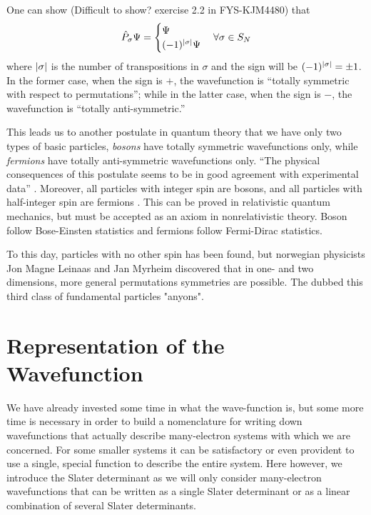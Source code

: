         One can show (Difficult to show? exercise 2.2 in FYS-KJM4480) that 
        \begin{equation}
            \hat{P}_\sigma\Psi = 
            \begin{cases}
                \Psi &\\
                (-1)^{\abs{\sigma}}\Psi& 
            \end{cases} \forall \sigma \in S_N
        \end{equation}
        where $\abs{\sigma}$ is the number of transpositions in $\sigma$ and the sign 
        will be $(-1)^{\abs{\sigma}} = \pm 1$. In the former case, when the sign is $+$,
        the wavefunction is ``totally symmetric with respect to permutations''; while in 
        the latter case, when the sign is $-$, the wavefunction is ``totally anti-symmetric.''

        This leads us to another postulate in quantum theory that we have only two types of 
        basic particles, \emph{bosons} have totally symmetric wavefunctions only, while 
        \emph{fermions} have totally anti-symmetric wavefunctions only. ``The physical 
        consequences of this postulate seems to be in good agreement with experimental data''
        \cite{leinaas1977theory}. Moreover, all particles with integer spin are bosons, 
        and all particles with half-integer spin are fermions
        \cite{fierz1939relativistische,pauli1940connection}. This can be proved in relativistic
        quantum mechanics, but must be accepted as an axiom in nonrelativistic 
        theory\cite{hilborn1995atoms}. Boson follow Bose-Einsten statistics and fermions
        follow Fermi-Dirac statistics.

        To this day, particles with no other spin has been found, but norwegian physicists
        Jon Magne Leinaas and Jan Myrheim discovered that in one- and two dimensions, more 
        general permutations symmetries are possible. The dubbed this third class of
        fundamental particles "anyons"\cite{leinaas1977theory}.
        
    \section{Representation of the Wavefunction}

        We have already invested some time in what the wave-function is, but some more time 
        is necessary in order to build a nomenclature for writing down wavefunctions that
        actually describe many-electron systems with which we are concerned. For some smaller
        systems it can be satisfactory or even provident to use a single, special function 
        to describe the entire system. Here however, we introduce the Slater determinant as 
        we will only consider many-electron wavefunctions that can be written as a single 
        Slater determinant or as a linear combination of several Slater determinants.

